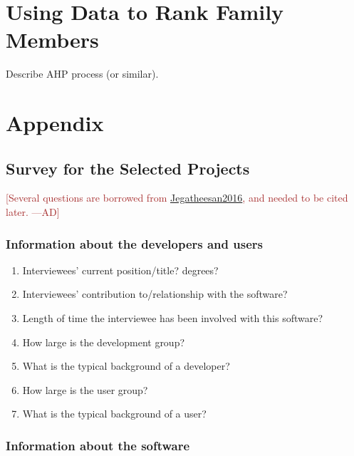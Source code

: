 \documentclass[letterpaper,cleveref]{lipics-v2019}
\newcommand{\authornote}[3]{\textcolor{#1}{[#3 ---#2]}}
\newcommand{\authornote}[3]{}
\newcommand{\ad}[1]{\authornote{brown}{AD}{#1}} %
\theoremstyle{definition}
\begin{document}
\section{Using Data to Rank Family Members}

Describe AHP process (or similar).

\appendix
\section{Appendix}
\subsection{Survey for the Selected Projects}
\ad{Several questions are borrowed from \href{https://gitlab.cas.mcmaster.ca/smiths/pub/-/blob/master/Jegatheesan2016.pdf}{Jegatheesan2016}, and needed to be cited later.}
\subsubsection{Information about the developers and users}
\begin{enumerate}
\item Interviewees' current position/title? degrees?
\item Interviewees' contribution to/relationship with the software?
\item Length of time the interviewee has been involved with this software?
\item How large is the development group?
\item What is the typical background of a developer?
\item How large is the user group?
\item What is the typical background of a user?
\end{enumerate}

\subsubsection{Information about the software}
\end{document}
